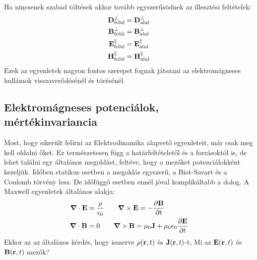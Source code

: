 \documentclass[a4paper,12pt]{article}
\begin{document}
Ha nincsenek szabad töltések akkor tovább egyszerűsödnek az illesztési feltételek:
\begin{equation}
    \begin{aligned}
        \bold{D}^{ \perp}_{\text{felül}} &= \bold{D}^{ \perp}_{\text{alul}} \\
        \bold{B}^{ \perp}_{\text{felül}} &= \bold{B}^{ \perp}_{\text{alul}} \\
        \bold{E}^{ \parallel}_{\text{felül}} &= \bold{E}^{ \parallel}_{\text{alul}} \\
        \bold{H}^{ \parallel}_{\text{felül}} &= \bold{H}^{ \parallel}_{\text{alul}}
    \end{aligned}
\end{equation}
Ezek az egyenletek nagyon fontos szerepet fognak játszani az elektromágneses hullámok visszaverődésénél és törésénél.

\subsection{Elektromágneses potenciálok, mértékinvariancia}
Most, hogy sikerült felírni az Elektrodinamika alapvető egyenleteit, már csak meg kell oldalni őket. Ez természetesen függ a határfeltételetől és a forrásoktól is, de lehet találni egy
általános megoldást, feltéve, hogy a mezőket potenciálokként kezeljük. Időben statikus esetben a megoldás egyszerű, a Biot-Savart és a Coulomb törvény lesz.
De időfüggő esetben ennél jóval komplikáltabb a dolog. A Maxwell egyenletek általános alakja:
\begin{equation}
    \begin{aligned}
        \boldsymbol{\nabla} \cdot \bold{E} &= \frac{\rho}{\epsilon_0} \qquad \boldsymbol{\nabla} \times \bold{E} = - \frac{\partial \bold{B}}{\partial t} \\
        \boldsymbol{\nabla} \cdot \bold{B} &= 0 \qquad \boldsymbol{\nabla} \times \bold{B} = \mu_0 \bold{J} + \mu_0 \epsilon_0 \frac{\partial \bold{E}}{\partial t} \\
    \end{aligned}
\end{equation}
Ekkor az az általános kérdés, hogy ismerve $\rho(\bold{r},t)$ és $\bold{J}(\bold{r},t)$-t, Mi az $\bold{E}(\bold{r},t)$ és $\bold{B}(\bold{r},t)$ mezők?
\end{document}
